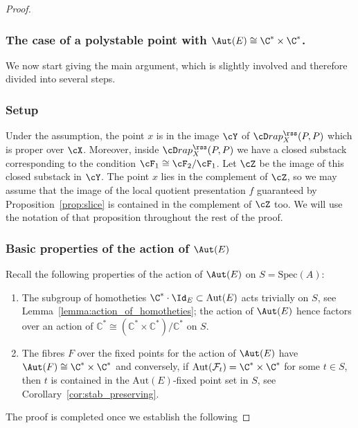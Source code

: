 \begin{proof}
\vspace*{-3pt}\vskip0pt
\subsubsection{The case of a polystable point with $\Aut(E)\cong\C^*\times\C^*$.} \label{subsubsect:main_result_main_case}

We now start giving the main argument, which is slightly involved and therefore divided into several steps.

\vspace*{-3pt}\vskip0pt
\subsubsection*{Setup} Under the assumption, the point $x$ is in the image $\cY$ of $\cD rap^{{\rss}}_X(P,P)$ which is proper over $\cX$. Moreover, inside $\cD rap^{{\rss}}_X(P,P)$ we have a closed substack corresponding to the condition $\cF_1\cong\cF_2/\cF_1$. Let $\cZ$ be the image of this closed substack in $\cY$. The point $x$ lies in the complement of $\cZ$, so we may assume that the image of the local quotient presentation $f$ guaranteed by Proposition~\ref{prop:slice} is contained in the complement of $\cZ$ too. We will use the notation of that proposition throughout the rest of the proof.

\subsubsection*{Basic properties of the action of $\Aut(E)$} Recall the following properties of the action of $\Aut(E)$ on $S = \mathrm{Spec}(A)$:
\begin{enumerate}
\item The subgroup of homotheties $\C^*\cdot \Id_E \subset \mathrm{Aut}(E)$ acts trivially on $S$, see Lemma~\ref{lemma:action_of_homotheties}; the action of $\Aut(E)$ hence factors over an action of $\mathbb{C}^* \cong (\mathbb{C}^* \times \mathbb{C}^*)/ \mathbb{C}^*$ on $S$.
\item The fibres $F$ over the fixed points for the action of $\Aut(E)$ have $\Aut(F)\cong\C^*\times\C^*$ and conversely, if $\mathrm{Aut}(\mathcal{F}_t) = \C^* \times \C^*$ for some $t \in S$, then $t$ is contained in the $\mathrm{Aut}(E)$-fixed point set in $S$, see Corollary~\ref{cor:stab_preserving}.
\end{enumerate}

The proof is completed once we establish the following\enlargethispage{\baselineskip}%


\end{proof}
